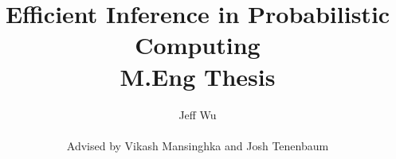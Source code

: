 \documentclass[10pt]{article}
\begin{document}
\title{{\bf Efficient Inference in Probabilistic Computing} \\ M.Eng Thesis}
\author{Jeff Wu \\ \\ {\small Advised by Vikash Mansinghka and Josh Tenenbaum}}
\date{}
\maketitle
%









%
%
%
%
%
%
%
%
%
%

\tableofcontents{}
\end{document}
